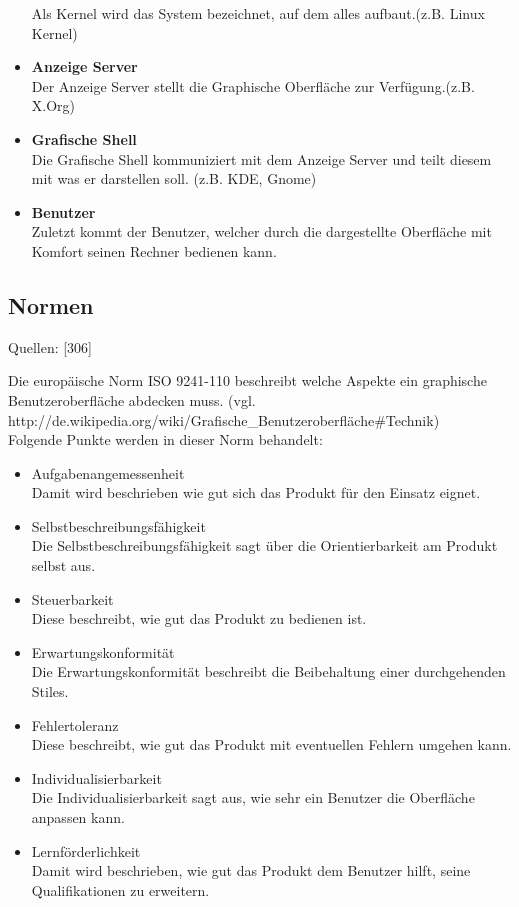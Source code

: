 \documentclass[12pt,a4paper]{report}
\begin{document}
\begin{onehalfspace}
\begin{itemize}
Als Kernel wird das System bezeichnet, auf dem alles aufbaut.(z.B. Linux Kernel)
\item \textbf{Anzeige Server}\\
Der Anzeige Server stellt die Graphische Oberfläche zur Verfügung.(z.B. X.Org)
\item \textbf{Grafische Shell}\\
Die Grafische Shell kommuniziert mit dem Anzeige Server und teilt diesem mit was er darstellen soll. (z.B. KDE, Gnome) 
\item \textbf{Benutzer}\\
Zuletzt kommt der Benutzer, welcher durch die dargestellte Oberfläche mit Komfort seinen Rechner bedienen kann. 
\end{itemize}
\subsection{Normen}
\begin{flushright}
\begin{tiny}
Quellen: [306]
\end{tiny}
\end{flushright}
Die europäische Norm ISO 9241-110 beschreibt welche Aspekte ein graphische Benutzeroberfläche abdecken muss. (vgl. http://de.wikipedia.org/wiki/Grafische\_Benutzeroberfläche\#Technik)\\
Folgende Punkte werden in dieser Norm behandelt:
\begin{itemize}
\item Aufgabenangemessenheit\\
Damit wird beschrieben wie gut sich das Produkt für den Einsatz eignet. 
\item Selbstbeschreibungsfähigkeit\\
Die Selbstbeschreibungsfähigkeit sagt über die Orientierbarkeit am Produkt selbst aus. 
\item Steuerbarkeit\\
Diese beschreibt, wie gut das Produkt zu bedienen ist. 
\item Erwartungskonformität\\
Die Erwartungskonformität beschreibt die Beibehaltung einer durchgehenden Stiles.
\item Fehlertoleranz\\
Diese beschreibt, wie gut das Produkt mit eventuellen Fehlern umgehen kann.
\item Individualisierbarkeit\\
Die Individualisierbarkeit sagt aus, wie sehr ein Benutzer die Oberfläche anpassen kann. 
\item Lernförderlichkeit\\
Damit wird beschrieben, wie gut das Produkt dem Benutzer hilft, seine Qualifikationen zu erweitern. 
\end{itemize}

\end{onehalfspace}
\end{document}
